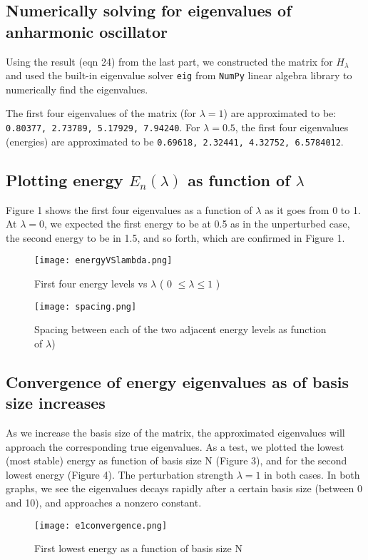 \documentclass[]{article}
\begin{document}
\subsection{Numerically solving for eigenvalues of anharmonic oscillator}

Using the result (eqn 24) from the last part, we constructed the matrix for $H_{\lambda}$ and used the 
built-in eigenvalue solver \texttt{eig} from \texttt{NumPy} linear algebra library to numerically find the eigenvalues. 

The first four eigenvalues of the matrix (for $\lambda=1$) are approximated to be: \texttt{0.80377, 2.73789, 5.17929, 7.94240}.
For $\lambda=0.5$, the first four eigenvalues (energies) are approximated to be
\texttt{0.69618, 2.32441, 4.32752, 6.5784012}.

\subsection{Plotting energy $E_n(\lambda)$ as function of $\lambda$}
Figure 1 shows the first four eigenvalues as a function of $\lambda$ as it goes from 0 to 1. At $\lambda=0$, we expected the first energy to be at 0.5 as in the unperturbed case, the second energy to be in 1.5, and so forth, which are confirmed in Figure 1. 
\begin{figure}[h!]
	\begin{center}   
		\texttt{[image: energyVSlambda.png]}
		\caption{First four energy levels vs $\lambda$ ( 0 $\leqslant \lambda \leqslant 1$ )} 
	\end{center}  
\end{figure}
\begin{figure}[h!]
	\begin{center}   
		\texttt{[image: spacing.png]}
		\caption{Spacing between each of the two adjacent energy levels as function of $\lambda$)} 
	\end{center}  
\end{figure}

\subsection{Convergence of energy eigenvalues as of basis size increases}
As we increase the basis size of the matrix, the approximated eigenvalues will approach the corresponding true eigenvalues. As a test, we plotted the lowest (most stable) energy as function of basis size N (Figure 3), and for the second lowest energy (Figure 4). The perturbation strength $\lambda =1$ in both cases. 
In both graphs, we see the eigenvalues decays rapidly after a certain basis size (between 0 and 10), and approaches a nonzero constant.
\begin{figure}[h!]
	\begin{center}   
		\texttt{[image: e1convergence.png]}
		\caption{First lowest energy as a function of basis size N} 
	\end{center}  
\end{figure}
\end{document}

